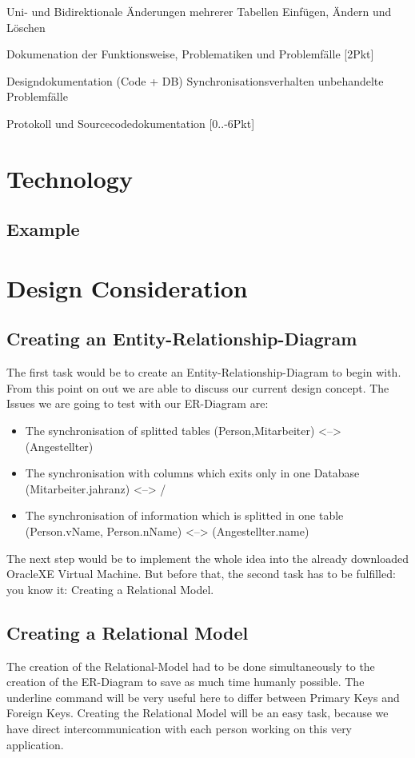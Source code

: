 \documentclass[11pt,a4paper]{article}
\begin{document}
Uni- und Bidirektionale Änderungen mehrerer Tabellen
Einfügen, Ändern und Löschen

Dokumenation der Funktionsweise, Problematiken und Problemfälle [2Pkt]

Designdokumentation (Code + DB)
Synchronisationsverhalten
unbehandelte Problemfälle

Protokoll und Sourcecodedokumentation [0..-6Pkt]

\newpage
\section{Technology}
\subsection{Example}


\newpage
\section{Design Consideration}
\subsection{Creating an Entity-Relationship-Diagram}
The first task would be to create an Entity-Relationship-Diagram to begin with. From this point on out we are able to discuss our current design concept. The Issues we are going to test with our ER-Diagram are:

\begin{itemize}
	\item The synchronisation of splitted tables (Person,Mitarbeiter) <--> (Angestellter)
	\item The synchronisation with columns which exits only in one Database (Mitarbeiter.jahranz) <--> /
	\item The synchronisation of information which is splitted in one table (Person.vName, Person.nName) <--> (Angestellter.name)
	
\end{itemize}

 The next step would be to implement the whole idea into the already downloaded OracleXE Virtual Machine. But before that, the second task has to be fulfilled: you know it: Creating a Relational Model.
\subsection{Creating a Relational Model}
The creation of the Relational-Model had to be done simultaneously to the creation of the ER-Diagram to save as much time humanly possible. The underline command will be very useful here to differ between Primary Keys and Foreign Keys. Creating the Relational Model will be an easy task, because we have direct intercommunication with each person working on this very application.
\end{document}
